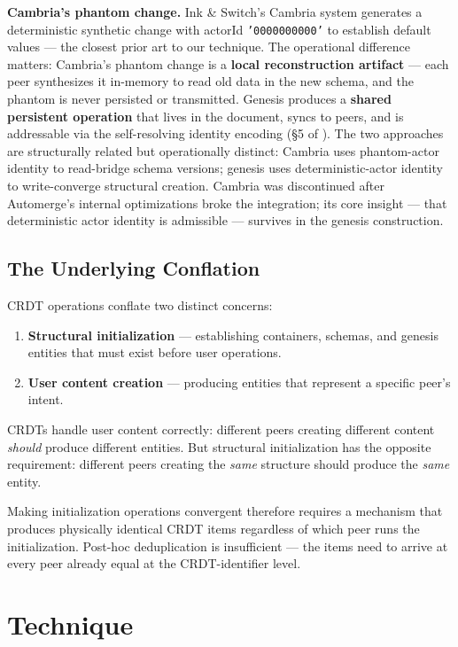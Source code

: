\textbf{Cambria's phantom change.} Ink \& Switch's Cambria system\cite{cambria2021} generates a deterministic synthetic change with actorId \texttt{'0000000000'} to establish default values --- the closest prior art to our technique. The operational difference matters: Cambria's phantom change is a \textbf{local reconstruction artifact} --- each peer synthesizes it in-memory to read old data in the new schema, and the phantom is never persisted or transmitted. Genesis produces a \textbf{shared persistent operation} that lives in the document, syncs to peers, and is addressable via the self-resolving identity encoding (\S5 of \cite{plexus:arch}). The two approaches are structurally related but operationally distinct: Cambria uses phantom-actor identity to read-bridge schema versions; genesis uses deterministic-actor identity to write-converge structural creation. Cambria was discontinued after Automerge's internal optimizations broke the integration; its core insight --- that deterministic actor identity is admissible --- survives in the genesis construction.

\subsection{The Underlying Conflation}

CRDT operations conflate two distinct concerns:

\begin{enumerate}
    \item \textbf{Structural initialization} --- establishing containers, schemas, and genesis entities that must exist before user operations.
    \item \textbf{User content creation} --- producing entities that represent a specific peer's intent.
\end{enumerate}

CRDTs handle user content correctly: different peers creating different content \emph{should} produce different entities. But structural initialization has the opposite requirement: different peers creating the \emph{same} structure should produce the \emph{same} entity.

Making initialization operations convergent therefore requires a mechanism that produces physically identical CRDT items regardless of which peer runs the initialization. Post-hoc deduplication is insufficient --- the items need to arrive at every peer already equal at the CRDT-identifier level.

\section{Technique}

